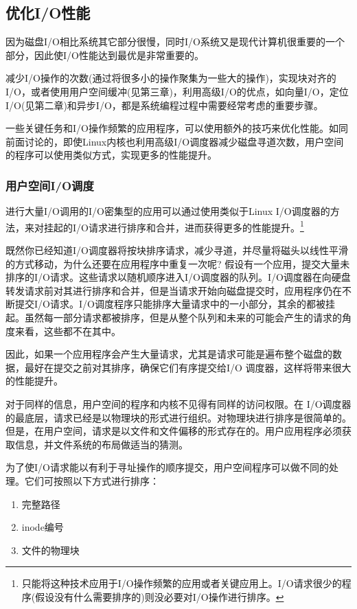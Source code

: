 \subsection{优化I/O性能}

因为磁盘I/O相比系统其它部分很慢，同时I/O系统又是现代计算机很重要的一个部分，因此使I/O性能达到最优是非常重要的。

减少I/O操作的次数(通过将很多小的操作聚集为一些大的操作)，实现块对齐的I/O，或者使用用户空间缓冲(见第三章)，利用高级I/O的优点，如向量I/O，定位I/O(见第二章)和异步I/O，都是系统编程过程中需要经常考虑的重要步骤。

一些关键任务和I/O操作频繁的应用程序，可以使用额外的技巧来优化性能。如同前面讨论的，即使Linux内核也利用高级I/O调度器减少磁盘寻道次数，用户空间的程序可以使用类似方式，实现更多的性能提升。

\subsubsection{用户空间I/O调度}

进行大量I/O调用的I/O密集型的应用可以通过使用类似于Linux I/O调度器的方法，来对挂起的I/O请求进行排序和合并，进而获得更多的性能提升。\footnote[1]{只能将这种技术应用于I/O操作频繁的应用或者关键应用上。I/O请求很少的程序(假设没有什么需要排序的)则没必要对I/O操作进行排序。}

既然你已经知道I/O调度器将按块排序请求，减少寻道，并尽量将磁头以线性平滑的方式移动，为什么还要在应用程序中重复一次呢? 假设有一个应用，提交大量未排序的I/O请求。这些请求以随机顺序进入I/O调度器的队列。I/O调度器在向硬盘转发请求前对其进行排序和合并，但是当请求开始向磁盘提交时，应用程序仍在不断提交I/O请求。I/O调度程序只能排序大量请求中的一小部分，其余的都被挂起。虽然每一部分请求都被排序，但是从整个队列和未来的可能会产生的请求的角度来看，这些都不在其中。

因此，如果一个应用程序会产生大量请求，尤其是请求可能是遍布整个磁盘的数据，最好在提交之前对其排序，确保它们有序提交给I/O 调度器，这样将带来很大的性能提升。
     
对于同样的信息，用户空间的程序和内核不见得有同样的访问权限。在 I/O调度器的最底层，请求已经是以物理块的形式进行组织。对物理块进行排序是很简单的。但是，在用户空间，请求是以文件和文件偏移的形式存在的。用户应用程序必须获取信息，并文件系统的布局做适当的猜测。
     
为了使I/O请求能以有利于寻址操作的顺序提交，用户空间程序可以做不同的处理。它们可按照以下方式进行排序：

\begin{enumerate}
\item 完整路径
\item inode编号
\item 文件的物理块
\end{enumerate}

